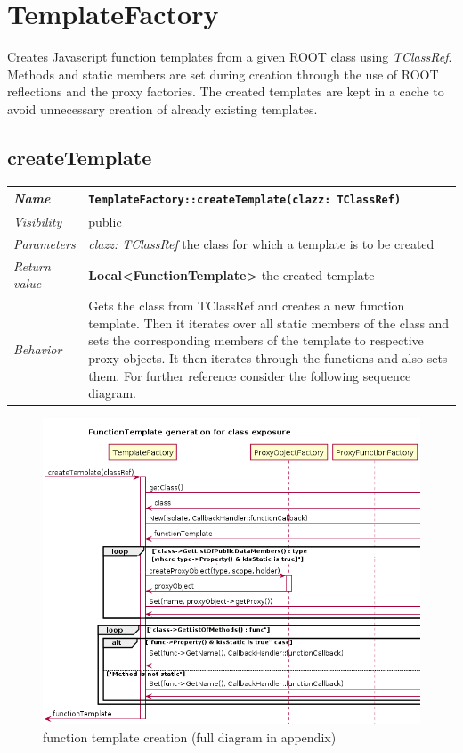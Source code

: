 \chapter{TemplateFactory}
Creates Javascript function templates from a given ROOT class using \textit{TClassRef}. Methods and static members are set during creation through the use of ROOT reflections and the proxy factories. 
The created templates are kept in a cache to avoid unnecessary creation of already existing templates.
\section{createTemplate}
\begin{longtable}{p{3cm} @{\hskip 1cm} p{12cm}}
 \hline
\textit{Name} & \texttt{TemplateFactory::createTemplate(clazz: TClassRef)}\\
\hline
 \textit{Visibility} & public\\
\hline
\textit{Parameters} & \textit{clazz: TClassRef} the class for which a template is to be created \\
\hline
\textit{Return value} & \textbf{Local<FunctionTemplate>} the created template\\
  \hline
 \textit{Behavior} & Gets the class from TClassRef and creates a new function template. 
			Then it iterates over all static members of the class and sets the
			corresponding members of the template to respective proxy objects.
			It then iterates through the functions and also sets them.
			For further reference consider the following sequence diagram.\\
\hline
\end{longtable} \pagebreak
 
\begin{figure}[htb]
\includegraphics[width=16cm]{./latex/resources/functionTemplateGenerateCrop.png}
	\caption{function template creation (full diagram in appendix)}
\end{figure}
